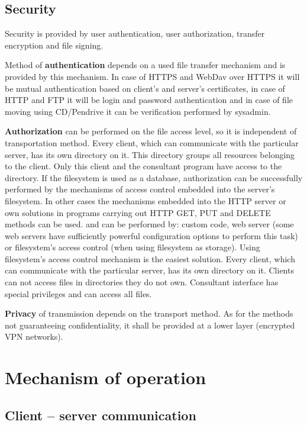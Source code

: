 \documentclass[a4paper]{article}
\begin{document}
\subsection{Security}

Security is provided by user authentication, user authorization, transfer encryption and
file signing.

Method of \textbf{authentication} depends on a used file transfer mechanism and is provided
by this mechanism. In case of HTTPS and WebDav over HTTPS it will be mutual
authentication based on client's and server's certificates, in case of HTTP and FTP it will be
login and password authentication and in case of file moving using CD/Pendrive it can be
verification performed by sysadmin.

\textbf{Authorization} can be performed on the file access level, so it is independent of 
transportation method. Every client, which can communicate with the particular server, has 
its own directory on it. This directory groups all resources belonging to the client. Only 
this client and the consultant program have access to the directory. If the filesystem is used
as a database, authorization can be successfully performed by the mechanisms of access control
embedded into the server’s filesystem. In other cases the mechanisms embedded into the HTTP
server or own solutions in programs carrying out HTTP GET, PUT and DELETE methods can be used. 
and can be performed by:
custom code, web server (some web servers have sufficiently powerful configuration options to perform
this task) or filesystem's access control (when using filesystem as storage). Using
filesystem's access control mechanism is the easiest solution. Every client,
which can communicate with the particular server, has its own directory on it.
Clients can not access files in directories they do not own. Consultant interface has
special privileges and can access all files.

\textbf{Privacy} of transmission depends on the transport method. As for the methods not
guaranteeing confidentiality, it shall be provided at a lower layer (encrypted VPN networks).

\section{Mechanism of operation}

\subsection{Client -- server communication}
\end{document}
